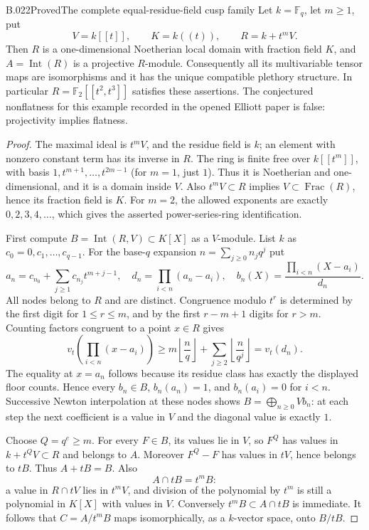 \begin{saresult}{B.022}{Proved}{The complete equal-residue-field cusp family}
Let $k=\mathbb F_q$, let $m\ge1$, put
\[
 V=k[[t]],\qquad K=k((t)),\qquad R=k+t^mV.
\]
Then $R$ is a one-dimensional Noetherian local domain with fraction
field $K$, and $A=\operatorname{Int}(R)$ is a projective $R$-module.
Consequently all its multivariable tensor maps are isomorphisms
and it has the unique compatible plethory structure.
In particular $R=\mathbb F_2[[t^2,t^3]]$ satisfies these assertions.
The conjectured nonflatness for this example recorded in the opened
Elliott paper \cite[introduction, p.2]{ElliottPresentations2011}
is false: projectivity implies flatness.
\end{saresult}
\begin{proof}
The maximal ideal is $t^mV$, and the residue field is $k$;
an element with nonzero constant term has its inverse in $R$.
The ring is finite free over $k[[t^m]]$, with basis
$1,t^{m+1},\ldots,t^{2m-1}$ (for $m=1$, just $1$).
Thus it is Noetherian and one-dimensional, and it is a domain
inside $V$. Also $t^mV\subset R$ implies
$V\subset\operatorname{Frac}(R)$, hence its fraction field is $K$.
For $m=2$, the allowed exponents are exactly $0,2,3,4,\ldots$,
which gives the asserted power-series-ring identification.

First compute $B=\operatorname{Int}(R,V)\subset K[X]$ as a
$V$-module. List $k$ as $c_0=0,c_1,\ldots,c_{q-1}$. For the
base-$q$ expansion $n=\sum_{j\ge0}n_jq^j$ put
\[
 a_n=c_{n_0}+\sum_{j\ge1}c_{n_j}t^{m+j-1},\quad
 d_n=\prod_{i<n}(a_n-a_i),\quad
 b_n(X)=\frac{\prod_{i<n}(X-a_i)}{d_n}.
\]
All nodes belong to $R$ and are distinct. Congruence modulo
$t^r$ is determined by the first digit for $1\le r\le m$,
and by the first $r-m+1$ digits for $r>m$. Counting factors
congruent to a point $x\in R$ gives
\[
 v_t\!\left(\prod_{i<n}(x-a_i)\right)\ge
 m\left\lfloor\frac nq\right\rfloor+
 \sum_{j\ge2}\left\lfloor\frac n{q^j}\right\rfloor
 =v_t(d_n).
\]
The equality at $x=a_n$ follows because its residue class has
exactly the displayed floor counts. Hence every $b_n\in B$,
$b_n(a_n)=1$, and $b_n(a_i)=0$ for $i<n$. Successive Newton
interpolation at these nodes shows
$B=\bigoplus_{n\ge0}Vb_n$: at each step the next coefficient
is a value in $V$ and the diagonal value is exactly $1$.

Choose $Q=q^e\ge m$. For every $F\in B$, its values lie in $V$,
so $F^Q$ has values in $k+t^QV\subset R$ and belongs to $A$.
Moreover $F^Q-F$ has values in $tV$, hence belongs to $tB$.
Thus $A+tB=B$. Also
\[
 A\cap tB=t^mB:
\]
a value in $R\cap tV$ lies in $t^mV$, and division of the
polynomial by $t^m$ is still a polynomial in $K[X]$ with values
in $V$. Conversely $t^mB\subset A\cap tB$ is immediate.
It follows that $C=A/t^mB$ maps isomorphically, as a $k$-vector
space, onto $B/tB$.


\end{proof}
